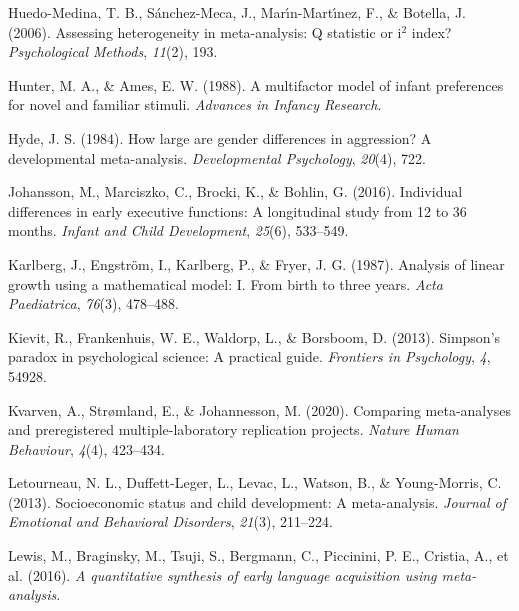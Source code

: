 \documentclass[
  man]{apa6}
\newlength{\cslhangindent}
\newlength{\cslentryspacingunit} %
\newenvironment{CSLReferences}[2] %
 {%
  \setlength{\parindent}{0pt}
  \ifodd #1
  \let\oldpar\par
  \def\par{\hangindent=\cslhangindent\oldpar}
  \fi
  \setlength{\parskip}{#2\cslentryspacingunit}
 }%
 {}
\begin{document}
\begin{CSLReferences}{1}{0}
\leavevmode{}%
Huedo-Medina, T. B., Sánchez-Meca, J., Marı́n-Martı́nez, F., \& Botella, J. (2006). Assessing heterogeneity in meta-analysis: Q statistic or i\(^2\) index? \emph{Psychological Methods}, \emph{11}(2), 193.

\leavevmode{}%
Hunter, M. A., \& Ames, E. W. (1988). A multifactor model of infant preferences for novel and familiar stimuli. \emph{Advances in Infancy Research}.

\leavevmode{}%
Hyde, J. S. (1984). How large are gender differences in aggression? A developmental meta-analysis. \emph{Developmental Psychology}, \emph{20}(4), 722.

\leavevmode{}%
Johansson, M., Marciszko, C., Brocki, K., \& Bohlin, G. (2016). Individual differences in early executive functions: A longitudinal study from 12 to 36 months. \emph{Infant and Child Development}, \emph{25}(6), 533--549.

\leavevmode{}%
Karlberg, J., Engström, I., Karlberg, P., \& Fryer, J. G. (1987). Analysis of linear growth using a mathematical model: I. From birth to three years. \emph{Acta Paediatrica}, \emph{76}(3), 478--488.

\leavevmode{}%
Kievit, R., Frankenhuis, W. E., Waldorp, L., \& Borsboom, D. (2013). Simpson's paradox in psychological science: A practical guide. \emph{Frontiers in Psychology}, \emph{4}, 54928.

\leavevmode{}%
Kvarven, A., Strømland, E., \& Johannesson, M. (2020). Comparing meta-analyses and preregistered multiple-laboratory replication projects. \emph{Nature Human Behaviour}, \emph{4}(4), 423--434.

\leavevmode{}%
Letourneau, N. L., Duffett-Leger, L., Levac, L., Watson, B., \& Young-Morris, C. (2013). Socioeconomic status and child development: A meta-analysis. \emph{Journal of Emotional and Behavioral Disorders}, \emph{21}(3), 211--224.

\leavevmode{}%
Lewis, M., Braginsky, M., Tsuji, S., Bergmann, C., Piccinini, P. E., Cristia, A., et al. (2016). \emph{A quantitative synthesis of early language acquisition using meta-analysis}.


\end{CSLReferences}
\end{document}
